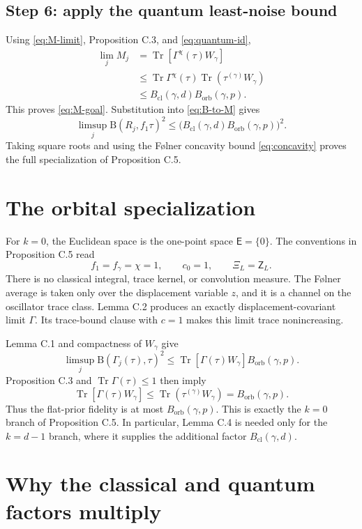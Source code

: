 \documentclass[11pt]{article}
\newcommand{\Tr}{\operatorname{Tr}}
\newcommand{\B}{\mathrm B}
\newcommand{\Bcl}{B_{\mathrm{cl}}}
\newcommand{\Borb}{B_{\mathrm{orb}}}
\begin{document}
\subsection*{Step 6: apply the quantum least-noise bound}

Using \eqref{eq:M-limit}, Proposition C.3, and
\eqref{eq:quantum-id},
\begin{align*}
  \lim_j M_j
  &=\Tr[\Gamma^\chi(\tau)W_\gamma]\\
  &\leq\Tr\Gamma^\chi(\tau)
    \Tr(\tau^{(\gamma)}W_\gamma)\\
  &\leq\Bcl(\gamma,d)\Borb(\gamma,p).
\end{align*}
This proves \eqref{eq:M-goal}.  Substitution into \eqref{eq:B-to-M} gives
\[
  \limsup_j\B(R_j,f_1\tau)^2
  \leq
  \bigl(\Bcl(\gamma,d)\Borb(\gamma,p)\bigr)^2.
\]
Taking square roots and using the F\o lner concavity bound
\eqref{eq:concavity} proves the full specialization of Proposition C.5.

\section{The orbital specialization}

For $k=0$, the Euclidean space is the one-point space $\mathsf E=\{0\}$.
The conventions in Proposition C.5 read
\[
  f_1=f_\gamma=\chi=1,
  \qquad
  c_0=1,
  \qquad
  \Xi_L=\mathsf Z_L.
\]
There is no classical integral, trace kernel, or convolution measure.  The
F\o lner average is taken only over the displacement variable $z$, and it is
a channel on the oscillator trace class.  Lemma C.2 produces an exactly
displacement-covariant limit $\Gamma$.  Its trace-bound clause with $c=1$
makes this limit trace nonincreasing.

Lemma C.1 and compactness of $W_\gamma$ give
\[
  \limsup_j\B(\Gamma_j(\tau),\tau)^2
  \leq
  \Tr[\Gamma(\tau)W_\gamma]\Borb(\gamma,p).
\]
Proposition C.3 and $\Tr\Gamma(\tau)\leq1$ then imply
\[
  \Tr[\Gamma(\tau)W_\gamma]
  \leq\Tr(\tau^{(\gamma)}W_\gamma)
  =\Borb(\gamma,p).
\]
Thus the flat-prior fidelity is at most $\Borb(\gamma,p)$.  This is exactly
the $k=0$ branch of Proposition C.5.  In particular, Lemma C.4 is needed only
for the $k=d-1$ branch, where it supplies the additional factor
$\Bcl(\gamma,d)$.

\section{Why the classical and quantum factors multiply}
\end{document}
